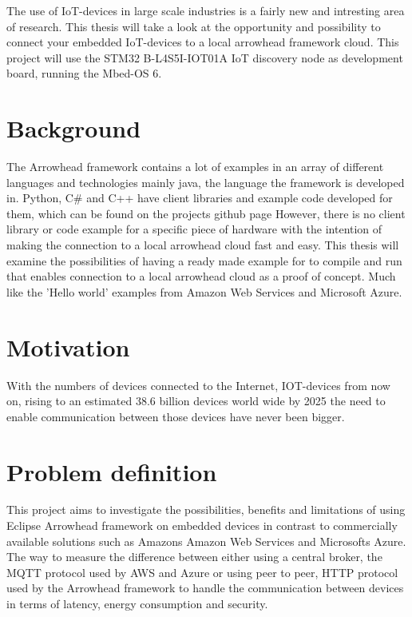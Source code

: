 The use of IoT-devices in large scale industries is a fairly new and intresting area of research. 
This thesis will take a look at the opportunity and possibility to connect your embedded IoT-devices to a local arrowhead framework cloud.
This project will use the STM32 B-L4S5I-IOT01A IoT discovery node as development board, running the Mbed-OS 6. 

\section{Background}
The Arrowhead framework contains a lot of examples in an array of different languages and technologies mainly java, the language the framework is developed in. 
Python, C\# and C++ have client libraries and example code developed for them, which can be found on the projects github page\cite{Github2021} 
However, there is no client library or code example for a specific piece of hardware with the intention of making the connection to a local arrowhead cloud fast and easy. 
This thesis will examine the possibilities of having a ready made example for to compile and run that enables connection to a local arrowhead cloud as a proof of concept. 
Much like the 'Hello world' examples from Amazon Web Services and Microsoft Azure. 

\section{Motivation}
With the numbers of devices connected to the Internet, IOT-devices from now on, rising to an estimated 38.6 billion devices world wide by 2025 the need to enable communication between those devices have never been bigger.

\section{Problem definition}
This project aims to investigate the possibilities, benefits and limitations of using Eclipse Arrowhead framework on embedded devices in contrast to commercially available solutions such
as Amazons Amazon Web Services and Microsofts Azure. 
The way to measure the difference between either 
using a central broker, the MQTT protocol used by AWS and Azure or using peer to peer, 
HTTP protocol used by the Arrowhead framework to handle the communication between devices in terms of latency, 
energy consumption and
security.
